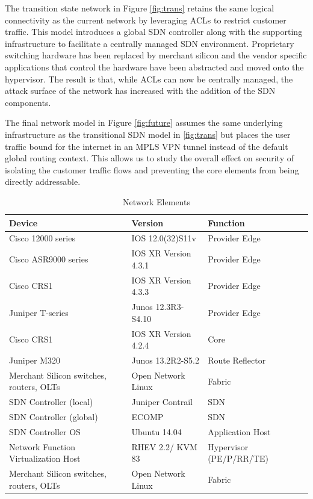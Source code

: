 The transition state network in Figure \ref{fig:trans} retains the same logical connectivity as the current network by leveraging ACLs to restrict customer traffic. This model introduces a global SDN controller along with the supporting infrastructure to facilitate a centrally managed SDN environment. Proprietary switching hardware has been replaced by merchant silicon and the vendor specific applications that control the hardware have been abstracted and moved onto the hypervisor. The result is that, while ACLs can now be centrally managed, the attack surface of the network has increased with the addition of the SDN components.

The final network model in Figure \ref{fig:future} assumes the same underlying infrastructure as the transitional SDN model in \ref{fig:trans} but places the user traffic bound for the internet in an MPLS VPN tunnel\cite{Muthukrishnan_Malis}\cite{Rosen_Rekhter_2006} instead of the default global routing context. This allows us to study the overall effect on security of isolating the customer traffic flows and preventing the core elements from being directly addressable.  

\begin{table}[ht]
\caption{Network Elements}\label{tab:current_elements}
\begin{tabular}{@{}llll@{}}
\toprule
Device               & Version              & Function        &  \\
 \midrule
Cisco 12000 series   & IOS 12.0(32)S11v     & Provider Edge     &  \\
Cisco ASR9000 series & IOS XR Version 4.3.1 & Provider Edge     &  \\
Cisco CRS1           & IOS XR Version 4.3.3 & Provider Edge     &  \\
Juniper T-series     & Junos 12.3R3-S4.10   & Provider Edge     &  \\
Cisco CRS1           & IOS XR Version 4.2.4 & Core            &  \\
Juniper M320         & Junos 13.2R2-S5.2    & Route Reflector &  \\
\midrule
Merchant Silicon switches, routers, OLTs & Open Network Linux & Fabric &  \\
SDN Controller (local) & Juniper Contrail & SDN &  \\
SDN Controller (global) & ECOMP & SDN &  \\
SDN Controller OS & Ubuntu 14.04 & Application Host &  \\
Network Function Virtualization Host & RHEV 2.2/ KVM 83 & Hypervisor (PE/P/RR/TE) &  \\
Merchant Silicon switches, routers, OLTs & Open Network Linux & Fabric &  \\ 
\bottomrule
\end{tabular}
\end{table}


